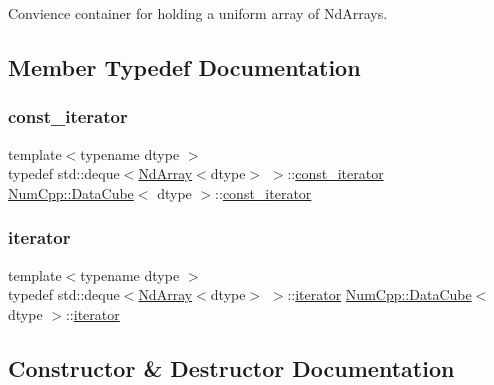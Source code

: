 Convience container for holding a uniform array of Nd\+Arrays. 

\subsection{Member Typedef Documentation}
\mbox{\label{class_num_cpp_1_1_data_cube_a5916086d9b71149eaa35651e2212de39}} 
\subsubsection{\texorpdfstring{const\+\_\+iterator}{const\_iterator}}
{\footnotesize\ttfamily template$<$typename dtype $>$ \\
typedef std\+::deque$<$\mbox{\hyperlink{class_num_cpp_1_1_nd_array}{Nd\+Array}}$<$dtype$>$ $>$\+::\mbox{\hyperlink{class_num_cpp_1_1_data_cube_a5916086d9b71149eaa35651e2212de39}{const\+\_\+iterator}} \mbox{\hyperlink{class_num_cpp_1_1_data_cube}{Num\+Cpp\+::\+Data\+Cube}}$<$ dtype $>$\+::\mbox{\hyperlink{class_num_cpp_1_1_data_cube_a5916086d9b71149eaa35651e2212de39}{const\+\_\+iterator}}}

\mbox{\label{class_num_cpp_1_1_data_cube_a817f739957d3d426e8a19a66867674ba}} 
\subsubsection{\texorpdfstring{iterator}{iterator}}
{\footnotesize\ttfamily template$<$typename dtype $>$ \\
typedef std\+::deque$<$\mbox{\hyperlink{class_num_cpp_1_1_nd_array}{Nd\+Array}}$<$dtype$>$ $>$\+::\mbox{\hyperlink{class_num_cpp_1_1_data_cube_a817f739957d3d426e8a19a66867674ba}{iterator}} \mbox{\hyperlink{class_num_cpp_1_1_data_cube}{Num\+Cpp\+::\+Data\+Cube}}$<$ dtype $>$\+::\mbox{\hyperlink{class_num_cpp_1_1_data_cube_a817f739957d3d426e8a19a66867674ba}{iterator}}}



\subsection{Constructor \& Destructor Documentation}
\mbox{\label{class_num_cpp_1_1_data_cube_a2be1915c2d9da633b802579690b7cc29}} 
